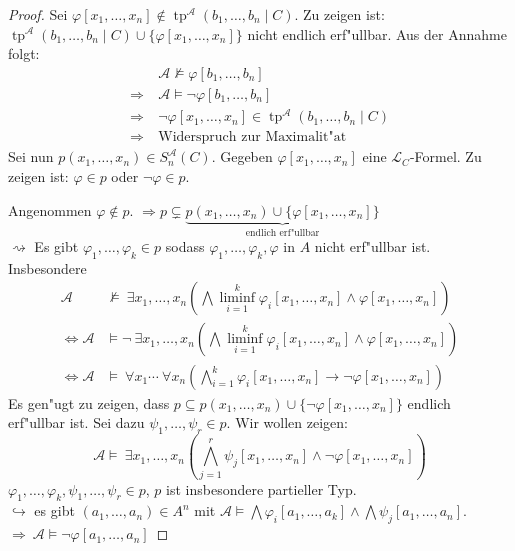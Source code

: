 \documentclass[a4paper,12pt,numbers=noenddot,parskip=full]{scrartcl}
\newcommand{\Forall}{~\forall}
\newcommand{\Exists}{~\exists}
\newcommand{\scrL}{\mathcal{L}}
\newcommand{\scrA}{\mathcal{A}}
\DeclareMathOperator{\typ}{tp}
\theoremstyle{dotless}
\theoremstyle{remark}
\begin{document}
\begin{proof}
	Sei $\varphi[x_1, \dots, x_n] \notin \typ^\scrA (b_1, \dots, b_n \mid C)$. Zu zeigen ist: $\typ^\scrA (b_1, \dots, b_n \mid C) \cup \{\varphi[x_1, \dots, x_n] \}$ nicht endlich erf"ullbar. Aus der Annahme folgt:
	\begin{align*}
		&\scrA \not\models \varphi[b_1, \dots, b_n]\\
		\Longrightarrow~ &\scrA \models \lnot \varphi[b_1, \dots, b_n]\\
		\Longrightarrow~ &\lnot \varphi[x_1, \dots, x_n] \in \typ^\scrA(b_1, \dots, b_n \mid C)\\
		\Longrightarrow~ &\text{Widerspruch zur Maximalit"at}
	\end{align*}
	Sei nun $p (x_1, \dots, x_n) \in S^\scrA_n (C)$. Gegeben $\varphi[x_1, \dots, x_n]$ eine $\scrL_C$-Formel. Zu zeigen ist: $\varphi \in p$ oder $\lnot \varphi \in p$.
	
	Angenommen $\varphi \notin p$. $\Longrightarrow p \subsetneq \underbrace{p(x_1, \dots, x_n) \cup \{\varphi[x_1, \dots, x_n] \}}_\text{endlich erf"ullbar}$\\
	$\rightsquigarrow$ Es gibt $\varphi_1, \dots, \varphi_k \in p$ sodass $\varphi_1, \dots, \varphi_k, \varphi$ in $A$ nicht erf"ullbar ist. Insbesondere
	\begin{align*}
		\scrA &\not\models \Exists x_1, \dots, x_n (\bigwedge\liminf_{i=1}^k \varphi_i[x_1, \dots, x_n] \land \varphi[x_1, \dots, x_n])\\
		\Longleftrightarrow \scrA &\models \lnot \Exists x_1, \dots, x_n (\bigwedge\liminf_{i=1}^k \varphi_i[x_1, \dots, x_n] \land \varphi[x_1, \dots, x_n])\\
		\Longleftrightarrow \scrA &\models \Forall x_1 \cdots \Forall x_n (\bigwedge\limits_{i=1}^k \varphi_i[x_1, \dots, x_n] \rightarrow \lnot \varphi[x_1, \dots, x_n])
	\end{align*}
	Es gen"ugt zu zeigen, dass $p \subseteq p(x_1, \dots, x_n) \cup \{\lnot \varphi[x_1, \dots, x_n]\}$ endlich erf"ullbar ist. 
	Sei dazu $\psi_1, \dots, \psi_r \in p$. Wir wollen zeigen: 
	\begin{equation*}
		\scrA \models \Exists x_1, \dots, x_n (\bigwedge\limits_{j=1}^r \psi_j [x_1, \dots, x_n] \land \lnot \varphi[x_1, \dots, x_n])
	\end{equation*}
	$\varphi_1, \dots, \varphi_k, \psi_1, \dots, \psi_r \in p$, $p$ ist insbesondere partieller Typ.\\
	$\hookrightarrow$ es gibt $(a_1, \dots, a_n) \in A^n$ mit $\scrA \models \bigwedge \varphi_i[a_1, \dots, a_k] \land \bigwedge \psi_j[a_1, \dots, a_n]$.\\
	$\Longrightarrow~ \scrA \models \lnot \varphi[a_1, \dots, a_n]$
\end{proof}
\end{document}
